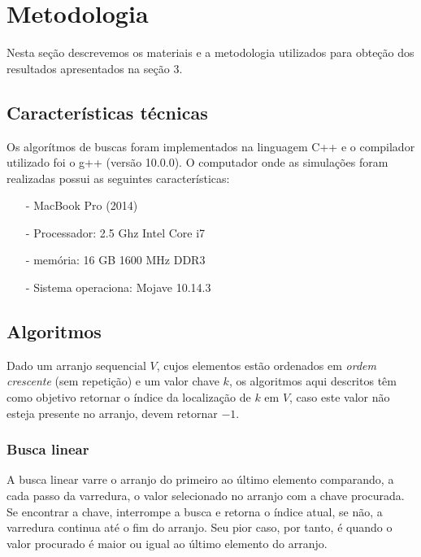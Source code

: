 \chapter{Metodologia}

Nesta seção descrevemos os materiais e a metodologia utilizados para obteção dos resultados apresentados na seção 3.

\section{Características técnicas}

Os algorítmos de buscas foram implementados na linguagem C++ e o compilador utilizado foi o g++ (versão 10.0.0). O computador onde as simulações foram realizadas possui as seguintes características:
\begin{itemize}
\item[-] MacBook Pro (2014)
\item[-] Processador: 2.5 Ghz Intel Core i7
\item[-] memória: 16 GB 1600 MHz DDR3
\item[-] Sistema operaciona: Mojave 10.14.3
\end{itemize}

\section{Algoritmos}

Dado um arranjo sequencial $V$, cujos elementos estão ordenados em {\it ordem crescente} (sem repetição) e um valor chave $k$, os algoritmos aqui descritos têm como objetivo retornar o índice da localização de $k$ em $V$, caso este valor não esteja presente no arranjo, devem retornar $-1$. 

\subsection{Busca linear}

A busca linear varre o arranjo do primeiro ao último elemento comparando, a cada passo da varredura, o valor selecionado no arranjo com a chave procurada. Se encontrar a chave, interrompe a busca e retorna o índice atual, se não, a varredura continua até o fim do arranjo. Seu pior caso, por tanto, é quando o valor procurado é maior ou igual ao último elemento do arranjo.

